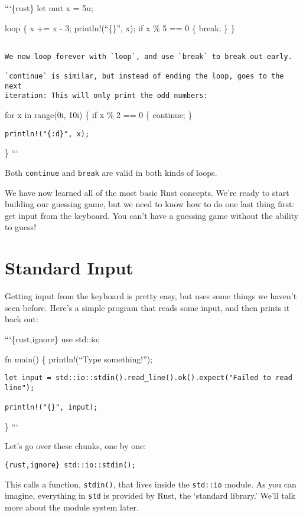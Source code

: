 \documentclass[]{article}
\begin{document}
```\{rust\} let mut x = 5u;

loop \{ x += x - 3; println!(``\{\}'', x); if x \% 5 == 0 \{ break; \}
\}

\begin{verbatim}

We now loop forever with `loop`, and use `break` to break out early.

`continue` is similar, but instead of ending the loop, goes to the next
iteration: This will only print the odd numbers:
\end{verbatim}

for x in range(0i, 10i) \{ if x \% 2 == 0 \{ continue; \}

\begin{verbatim}
println!("{:d}", x);
\end{verbatim}

\} ```

Both \texttt{continue} and \texttt{break} are valid in both kinds of
loops.

We have now learned all of the most basic Rust concepts. We're ready to
start building our guessing game, but we need to know how to do one last
thing first: get input from the keyboard. You can't have a guessing game
without the ability to guess!

\section{Standard Input}\label{standard-input}

Getting input from the keyboard is pretty easy, but uses some things we
haven't seen before. Here's a simple program that reads some input, and
then prints it back out:

```\{rust,ignore\} use std::io;

fn main() \{ println!(``Type something!'');

\begin{verbatim}
let input = std::io::stdin().read_line().ok().expect("Failed to read line");

println!("{}", input);
\end{verbatim}

\} ```

Let's go over these chunks, one by one:

\texttt{\{rust,ignore\} std::io::stdin();}

This calls a function, \texttt{stdin()}, that lives inside the
\texttt{std::io} module. As you can imagine, everything in \texttt{std}
is provided by Rust, the `standard library.' We'll talk more about the
module system later.
\end{document}
